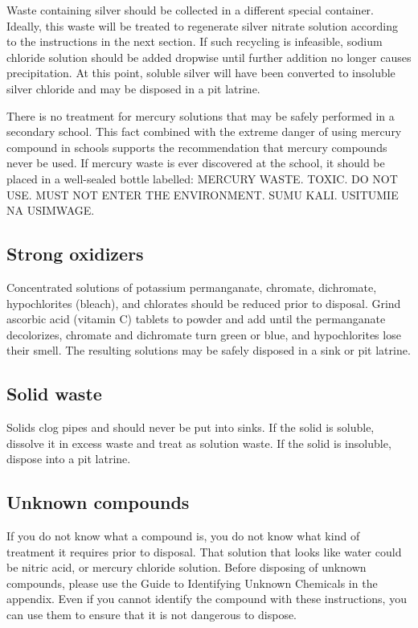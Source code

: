 Waste containing silver should be collected in a different special container. 
Ideally, this waste will be treated to regenerate silver nitrate solution 
according to the instructions in the next section. 
If such recycling is infeasible, 
sodium chloride solution should be added dropwise 
until further addition no longer causes precipitation. 
At this point, soluble silver will have been converted 
to insoluble silver chloride and may be disposed in a pit latrine.

There is no treatment for mercury solutions 
that may be safely performed in a secondary school. 
This fact combined with the extreme danger 
of using mercury compound in schools 
supports the recommendation that mercury compounds never be used. 
If mercury waste is ever discovered at the school, 
it should be placed in a well-sealed bottle labelled: 
MERCURY WASTE. 
TOXIC. 
DO NOT USE. 
MUST NOT ENTER THE ENVIRONMENT. 
SUMU KALI. 
USITUMIE NA USIMWAGE.

\subsection{Strong oxidizers}
Concentrated solutions of potassium permanganate, 
chromate, dichromate, hypochlorites (bleach), and chlorates 
should be reduced prior to disposal. 
Grind ascorbic acid (vitamin C) tablets to powder 
and add until the permanganate decolorizes, 
chromate and dichromate turn green or blue, and hypochlorites lose their smell. 
The resulting solutions may be safely disposed in a sink or pit latrine.

\subsection{Solid waste}
Solids clog pipes and should never be put into sinks. 
If the solid is soluble, dissolve it in excess waste 
and treat as solution waste. 
If the solid is insoluble, dispose into a pit latrine.

\subsection{Unknown compounds}
If you do not know what a compound is, 
you do not know what kind of treatment it requires prior to disposal. 
That solution that looks like water could be nitric acid, 
or mercury chloride solution. 
Before disposing of unknown compounds, 
please use the Guide to Identifying Unknown Chemicals in the appendix. 
Even if you cannot identify the compound with these instructions, 
you can use them to ensure that it is not dangerous to dispose.


